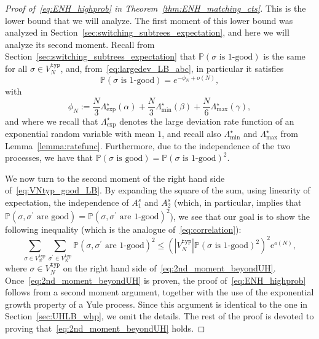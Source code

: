 \documentclass[11pt]{article}
\numberwithin{equation}{section}
\newcommand{\p}{\mathbb{P}} %
\newcommand{\e}{\mathrm e}
\theoremstyle{definition}
\begin{document}
\begin{proof}[Proof of~\eqref{eq:ENH_highprob} in Theorem~\ref{thm:ENH_matching_cts}]
This is the lower bound that we will analyze. The first moment of this lower bound was analyzed in Section~\ref{sec:switching_subtrees_expectation}, 
and here we will analyze its second moment. 
Recall from Section~\ref{sec:switching_subtrees_expectation} that 
$\p \left( \sigma \text{ is 1-good} \right)$ is the same for all $\sigma \in V_{N}^{\mathtt{typ}}$, 
and, from~\eqref{eq:largedev_LB_abc}, in particular it satisfies 
    \begin{equation}\label{eq:1goodprob}
        \p \left( \sigma \text{ is 1-good} \right)= e^{-\phi_N + o(N)},
    \end{equation}
with 
    \begin{equation*}
        \phi_N := \frac{N}{3} \Lambda_{\exp}^{\star} (\alpha) +\frac{N}{3} \Lambda_{\min}^{\star} (\beta)+\frac{N}{6} \Lambda_{\max}^{\star} (\gamma),
    \end{equation*}
and where we recall that $\Lambda^\star_{\mathrm{exp}}$ denotes the large deviation rate function of an exponential random variable with mean $1$, and recall also $\Lambda_{\min}^{\star}$ and $\Lambda_{\max}^{\star}$ from Lemma~\ref{lemma:ratefunc}. 
Furthermore, due to the independence of the two processes, we have that 
$\p \left( \sigma \text{ is good} \right) 
= \p \left( \sigma \text{ is 1-good} \right)^{2}$. 

We now turn to the second moment of the right hand side of~\eqref{eq:VNtyp_good_LB}. 
By expanding the square of the sum, 
using linearity of expectation, 
the independence of $A_{1}^{s}$ and $A_{2}^{s}$ (which, in particular, implies that $\mathbb{P} \left( \sigma, \sigma^\prime \text{ are good}  \right)
= \mathbb{P} \left( \sigma, \sigma^\prime \text{ are 1-good}  \right)^{2}$), 
we see that our goal is to show the following inequality (which is the analogue of~\eqref{eq:correlation}):
    \begin{equation}\label{eq:2nd_moment_beyondUH}
        \sum_{\sigma \in V_N^{\mathtt{typ}}} \sum_{\sigma^\prime \in V_N^{\mathtt{typ}}} \mathbb{P} \left( \sigma, \sigma^\prime \text{ are 1-good}  \right)^{2}
        \leq 
        \left( \left| V_N^{\mathtt{typ}} \right| \mathbb{P} \left( \sigma \text{ is 1-good}  \right)^{2} \right)^2 \e^{o(N)},
    \end{equation}
where $\sigma \in V_N^{\mathtt{typ}}$ on the right hand side of~\eqref{eq:2nd_moment_beyondUH}. 
Once~\eqref{eq:2nd_moment_beyondUH} is proven, the proof of~\eqref{eq:ENH_highprob} follows from a second moment argument, together with the use of the exponential growth property of a Yule process. Since this argument is identical to the one in Section~\ref{sec:UHLB_whp}, we omit the details. 
The rest of the proof is devoted to proving that~\eqref{eq:2nd_moment_beyondUH} holds. 



\end{proof}
\end{document}
